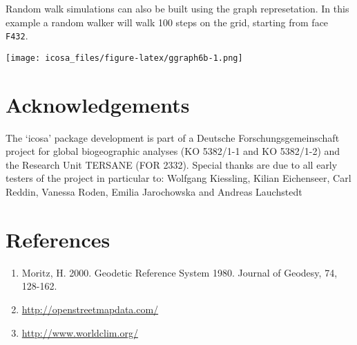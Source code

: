 \documentclass[]{article}
\newenvironment{Shaded}{\begin{snugshade}}{\end{snugshade}}
\newcommand{\KeywordTok}[1]{\textcolor[rgb]{0.13,0.29,0.53}{\textbf{#1}}}
\newcommand{\DataTypeTok}[1]{\textcolor[rgb]{0.13,0.29,0.53}{#1}}
\newcommand{\DecValTok}[1]{\textcolor[rgb]{0.00,0.00,0.81}{#1}}
\newcommand{\StringTok}[1]{\textcolor[rgb]{0.31,0.60,0.02}{#1}}
\newcommand{\CommentTok}[1]{\textcolor[rgb]{0.56,0.35,0.01}{\textit{#1}}}
\newcommand{\ControlFlowTok}[1]{\textcolor[rgb]{0.13,0.29,0.53}{\textbf{#1}}}
\newcommand{\OperatorTok}[1]{\textcolor[rgb]{0.81,0.36,0.00}{\textbf{#1}}}
\newcommand{\NormalTok}[1]{#1}
\providecommand{\tightlist}{%
  \setlength{\itemsep}{0pt}\setlength{\parskip}{0pt}}
\begin{document}
Random walk simulations can also be built using the graph represetation.
In this example a random walker will walk 100 steps on the grid,
starting from face \texttt{F432}.

\begin{Shaded}
\end{Shaded}

\texttt{[image: icosa\_files/figure-latex/ggraph6b-1.png]}

\section{Acknowledgements}\label{acknowledgements}

The `icosa' package development is part of a Deutsche
Forschungsgemeinschaft project for global biogeographic analyses (KO
5382/1-1 and KO 5382/1-2) and the Research Unit TERSANE (FOR 2332).
Special thanks are due to all early testers of the project in particular
to: Wolfgang Kiessling, Kilian Eichenseer, Carl Reddin, Vanessa Roden,
Emilia Jarochowska and Andreas Lauchstedt

\section{References}\label{references}

\begin{enumerate}
\def\labelenumi{(\arabic{enumi})}
\tightlist
\item
  Moritz, H. 2000. Geodetic Reference System 1980. Journal of Geodesy,
  74, 128-162.
\item
  \url{http://openstreetmapdata.com/}
\item
  \url{http://www.worldclim.org/}
\end{enumerate}
\end{document}
